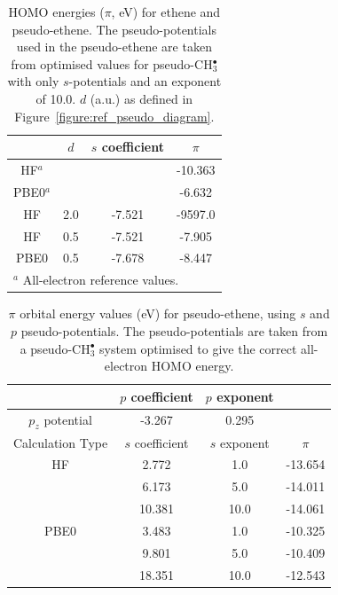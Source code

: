 \documentclass[aip,reprint]{revtex4-1}
\begin{document}
\newpage

\begin{table}[ht]
\begin{tabular}{c c c c}
\hline\hline
& $d$ & \(s\) coefficient & \( \pi \)  \\
\hline
HF$^a$   &     &        & -10.363 \\
PBE0$^a$ &     &        & -6.632 \\
HF       & 2.0 & -7.521 & -9597.0 \\
HF       & 0.5 & -7.521  & -7.905 \\
PBE0     & 0.5 &-7.678  & -8.447 \\
\hline\hline
\multicolumn{4}{l}{$^a$ All-electron reference values.}\\
\end{tabular}
\caption{HOMO energies ($\pi$, eV) for ethene and pseudo-ethene. The pseudo-potentials used in the pseudo-ethene are taken from optimised values for 
pseudo-CH\(^{\bullet}_{3}\) with only \(s\)-potentials and an exponent of 10.0. $d$ (a.u.) as defined 
in Figure~\ref{figure:ref_pseudo_diagram}.}
\label{table:ethene_s_pseudo}
\end{table}

\newpage

\begin{table}[ht]
\begin{tabular}{c c c c}
\hline\hline
& \(p\) coefficient & \(p\) exponent \\
\hline
\(p_{z}\) potential & -3.267 & 0.295 \\
\hline
Calculation Type & \(s\) coefficient & \(s\) exponent & \(\pi\) \\
\hline
HF & 2.772 & 1.0 & -13.654 \\
 & 6.173 & 5.0 & -14.011 \\
 & 10.381 & 10.0 & -14.061 \\
\hline
PBE0 & 3.483 & 1.0 & -10.325 \\
 & 9.801 & 5.0 & -10.409 \\
 & 18.351 & 10.0 & -12.543 \\
\hline\hline
\end{tabular}
\caption{\(\pi\) orbital energy values (eV) for pseudo-ethene, using \(s\) and \(p\) pseudo-potentials.
The pseudo-potentials are taken from a pseudo-CH\(^{\bullet}_{3}\) system optimised to give the correct all-electron HOMO energy.}
\label{table:p_potentials}
\end{table}
\end{document}
